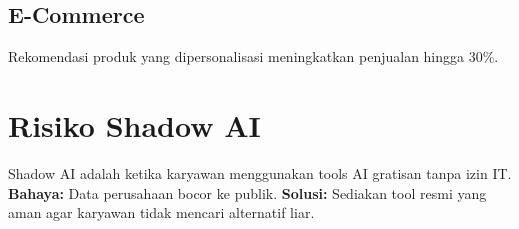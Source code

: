 \subsection{E-Commerce}
Rekomendasi produk yang dipersonalisasi meningkatkan penjualan hingga 30\%.

\section{Risiko Shadow AI}

Shadow AI adalah ketika karyawan menggunakan tools AI gratisan tanpa izin IT.
\textbf{Bahaya:} Data perusahaan bocor ke publik.
\textbf{Solusi:} Sediakan tool resmi yang aman agar karyawan tidak mencari alternatif liar.
